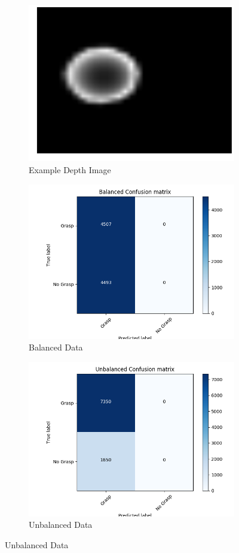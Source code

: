 \begin{figure}[t!]
    \begin{subfigure}[t]{0.24\textwidth}
        \includegraphics[width=0.75\columnwidth]{figs/depth_example.pdf} \caption{Example Depth Image} \label{fig:depth_image}
        \end{subfigure}
    \begin{subfigure}[t]{0.24\textwidth}
        \includegraphics[width=0.9\columnwidth]{figs/balanced_results.png} \caption{Balanced Data} \label{fig:balanced_confusion}
    \end{subfigure}
		\begin{subfigure}[t]{0.24\textwidth}
        \includegraphics[width=0.9\columnwidth]{figs/unbalanced_results.png} \caption{Unbalanced Data} \label{fig:unbalanced_confusion}

\end{subfigure}
\end{figure}
